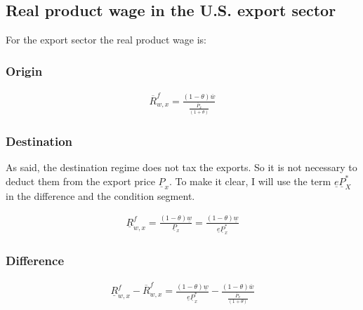 \subsection*{Real product wage in the U.S. export sector}
For the export sector the real product wage is:
\subsubsection*{Origin}
\begin{equation}\label{proxw.o}
\begin{aligned}
\overline R^f_{w, x} = \frac{ \left( 1-\theta \right) \overline w}{\frac{\overline P_x}{ \left( 1+\theta \right) }}\end{aligned}  \end{equation}

\subsubsection*{Destination}
As said, the destination regime does not tax the exports. So it is not necessary to deduct them from the export price $\underline P_x$. To make it clear, I will use the term $\underline e \underline P_X^*$ in the difference and the condition segment.


\begin{equation}\label{proxw.d} 
\begin{aligned}
\underline R^f_{w, x} = \frac{ \left( 1-\theta \right) \underline w}{\underline P_x} = \frac{ \left( 1-\theta \right) \underline w}{\underline e \underline P^*_x}\end{aligned}  \end{equation}

\subsubsection*{Difference}
\begin{equation}\label{proxw.diff} 
\begin{aligned}
\underline R^f_{w, x} - \overline R^f_{w, x} = \frac{ \left( 1-\theta \right) \underline w}{\underline e \underline P^*_x} - \frac{ \left( 1-\theta \right) \overline w}{\frac{\overline P_x}{ \left( 1+\theta \right) }}\end{aligned}  \end{equation}

